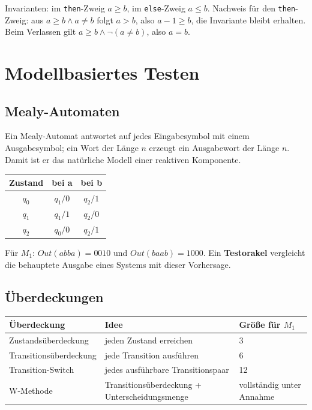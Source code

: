 \documentclass[12pt, a4paper]{article}
\begin{document}
Invarianten: im \texttt{then}-Zweig $a \geq b$, im \texttt{else}-Zweig $a \leq b$.
Nachweis für den \texttt{then}-Zweig: aus $a \geq b \wedge a \neq b$ folgt $a > b$,
also $a - 1 \geq b$, die Invariante bleibt erhalten. Beim Verlassen gilt
$a \geq b \wedge \neg(a \neq b)$, also $a = b$.

\section{Modellbasiertes Testen}

\subsection{Mealy-Automaten}

Ein Mealy-Automat antwortet auf jedes Eingabesymbol mit einem Ausgabesymbol; ein Wort
der Länge $n$ erzeugt ein Ausgabewort der Länge $n$. Damit ist er das natürliche
Modell einer reaktiven Komponente.

\begin{center}
\begin{tabular}{ccc}
\hline
\textbf{Zustand} & \textbf{bei a} & \textbf{bei b} \\
\hline
$q_0$ & $q_1/0$ & $q_2/1$ \\
$q_1$ & $q_1/1$ & $q_2/0$ \\
$q_2$ & $q_0/0$ & $q_2/1$ \\
\hline
\end{tabular}
\end{center}

Für $M_1$: $Out(abba) = 0010$ und $Out(baab) = 1000$. Ein \textbf{Testorakel}
vergleicht die behauptete Ausgabe eines Systems mit dieser Vorhersage.

\subsection{Überdeckungen}

\begin{center}
\begin{tabular}{lll}
\hline
\textbf{Überdeckung} & \textbf{Idee} & \textbf{Größe für $M_1$} \\
\hline
Zustandsüberdeckung & jeden Zustand erreichen & 3 \\
Transitionsüberdeckung & jede Transition ausführen & 6 \\
Transition-Switch & jedes ausführbare Transitionspaar & 12 \\
W-Methode & Transitionsüberdeckung + Unterscheidungsmenge & vollständig unter Annahme \\
\hline
\end{tabular}
\end{center}
\end{document}
